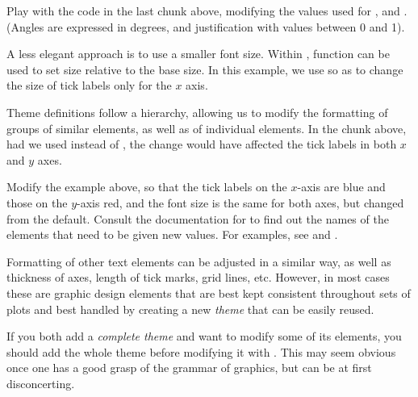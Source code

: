 \documentclass[krantz2]{krantz}\usepackage{knitr}
\begin{document}
\begin{playground}
Play with the code in the last chunk above, modifying the values used for ,  and . (Angles are expressed in degrees, and justification with values between 0 and 1).
\end{playground}

A less elegant approach is to use a smaller font size. Within , function  can be used to set size relative to the base size. In this example, we use  so as to change the size of tick labels only for the $x$ axis.

\begin{knitrout}\footnotesize
{}\color{fgcolor}\begin{kframe}
\begin{alltt}
  \hlstd{(} \hlstd{=} \hlstd{(} \hlstd{=} \hlstd{(}\hlstd{)))}
\end{alltt}
\end{kframe}
\end{knitrout}

Theme definitions follow a hierarchy, allowing us to modify the formatting of groups of similar elements, as well as of individual elements. In the chunk above, had we used  instead of , the change would have affected the tick labels in both $x$ and $y$ axes.

\begin{playground}
Modify the example above, so that the tick labels on the $x$-axis are blue and those on the $y$-axis red, and the font size is the same for both axes, but changed from the default. Consult the documentation for  to find out the names of the elements that need to be given new values. For examples, see  \autocite{Wickham2016} and  \autocite{Chang2018}.
\end{playground}

Formatting of other text elements can be adjusted in a similar way, as well as thickness of axes, length of tick marks, grid lines, etc. However, in most cases these are graphic design elements that are best kept consistent throughout sets of plots and best handled by creating a new \emph{theme} that can be easily reused.

\begin{warningbox}
If you both add a \emph{complete theme} and want to modify some of its elements, you should add the whole theme before modifying it with . This may seem obvious once one has a good grasp of the grammar of graphics, but can be at first disconcerting.
\end{warningbox}
\end{document}
